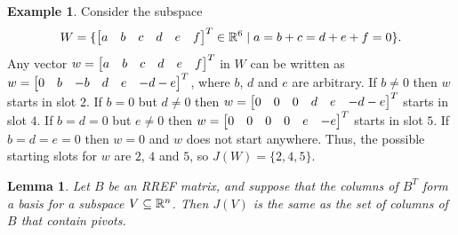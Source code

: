 \documentclass[reqno]{amsart}
\newtheorem{lemma}[theorem]{Lemma}
\theoremstyle{definition}
\newtheorem{example}[theorem]{Example}
\begin{document}
\begin{example}\label{eg-jumps-ii}
 Consider the subspace
 \[ W = \{\left[\begin{matrix} a&b&c&d&e&f\end{matrix}\right]^T\in{\mathbb{R}}^6\;|\; a=b+c=d+e+f=0\}. \]
 Any vector $w=\left[\begin{matrix} a&b&c&d&e&f\end{matrix}\right]^T$ in $W$ can be written as
 $w=\left[\begin{matrix} 0&b&-b&d&e&-d-e\end{matrix}\right]^T$, where $b$, $d$ and $e$ are
 arbitrary.  If $b\neq 0$ then $w$ starts in slot $2$.  If $b=0$ but
 $d\neq 0$ then $w=\left[\begin{matrix} 0&0&0&d&e&-d-e\end{matrix}\right]^T$ starts in slot $4$.  If
 $b=d=0$ but $e\neq 0$ then $w=\left[\begin{matrix} 0&0&0&0&e&-e\end{matrix}\right]^T$ starts in slot
 $5$.  If $b=d=e=0$ then $w=0$ and $w$ does not start anywhere.  Thus,
 the possible starting slots for $w$ are $2$, $4$ and $5$, so
 $J(W)=\{2,4,5\}$.
\end{example}

\begin{lemma}\label{lem-jumps-pivots}
 Let $B$ be an RREF matrix, and suppose that the columns of $B^T$ form
 a basis for a subspace $V\subseteq{\mathbb{R}}^n$.  Then $J(V)$ is the same as the
 set of columns of $B$ that contain pivots.
\end{lemma}
\end{document}

